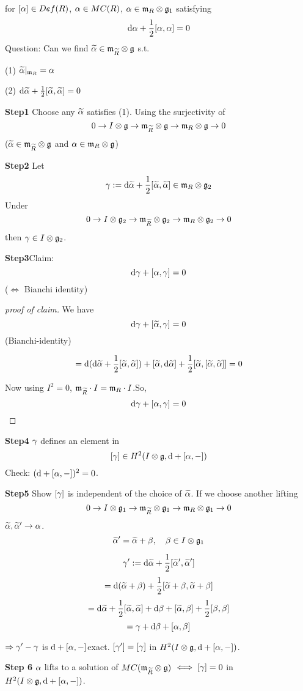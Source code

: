 for $[\alpha]\in Def(R)$, $\alpha\in MC(R)$,
$\alpha\in\mathfrak{m}_R\otimes\mathfrak{g}_1$ satisfying
$$\mathrm{d} \alpha+\frac{1}{2}[\alpha,\alpha]=0$$
Question: Can we find $\widetilde{\alpha}\in\mathfrak{m}_{\widetilde{R}}\otimes\mathfrak{g}$ s.t.

(1) $\widetilde{\alpha}|_{\mathfrak{m}_R}=\alpha$

(2) $\mathrm{d}\widetilde{\alpha}+\frac{1}{2}[\widetilde{\alpha},\widetilde{\alpha}]=0$

\textbf{Step1} Choose any $\widetilde{\alpha}$ satisfies (1).
Using the surjectivity of 
$$0\to I\otimes\mathfrak{g}\to\mathfrak{m}_{\widetilde{R}}\otimes\mathfrak{g}\to\mathfrak{m}_R\otimes\mathfrak{g}\to 0$$
($\widetilde{\alpha}\in \mathfrak{m}_{\widetilde{R}}\otimes\mathfrak{g}$ and $\alpha\in \mathfrak{m}_R\otimes\mathfrak{g}$)

\textbf{Step2} Let
$$\gamma:=\mathrm{d}\widetilde{\alpha}+\frac{1}{2}[\widetilde{\alpha},\widetilde{\alpha}]\in\mathfrak{m}_R\otimes\mathfrak{g}_2$$
Under 
$$0\to I\otimes\mathfrak{g}_2\to\mathfrak{m}_{\widetilde{R}}\otimes\mathfrak{g}_2\to\mathfrak{m}_R\otimes\mathfrak{g}_2\to 0$$
then $\gamma\in I\otimes\mathfrak{g}_2$.

\textbf{Step3}Claim: 
$$\mathrm{d}\gamma+[\alpha,\gamma]=0$$
($\iff$ Bianchi identity)

\begin{proof}[proof of claim]
We have 
$$\mathrm{d}\gamma+[\widetilde{\alpha},\gamma]=0$$
(Bianchi-identity)

$$
  =\mathrm{d}(\mathrm{d}\widetilde{\alpha}+\frac{1}{2}[\widetilde{\alpha},\widetilde{\alpha}])+[\widetilde{\alpha},\mathrm{d}\widetilde{\alpha}]
   +\frac{1}{2}[\widetilde{\alpha},[\widetilde{\alpha},\widetilde{\alpha}]]
  =0
$$

Now using $I^2=0$,
$\mathfrak{m}_{\widetilde{R}}\cdot I=\mathfrak{m}_R\cdot I$.So,
$$\mathrm{d}\gamma+[\alpha,\gamma]=0$$
\end{proof}

\textbf{Step4} $\gamma$ defines an element in
$$[\gamma]\in H^2(I\otimes\mathfrak{g},\mathrm{d}+[\alpha,-])$$
Check: $(\mathrm{d}+[\alpha,-])^2=0$.

\textbf{Step5} Show $[\gamma]$ is independent of the choice of $\widetilde{\alpha}$.
If we choose another lifting 
$$
  0\to I\otimes\mathfrak{g}_1\to\mathfrak{m}_{\widetilde{R}}\otimes\mathfrak{g}_1
  \to\mathfrak{m}_R\otimes\mathfrak{g}_1\to 0
$$
$\widetilde{\alpha},\widetilde{\alpha}'\to\alpha$.
$$\widetilde{\alpha}'=\widetilde{\alpha}+\beta,\quad\beta\in I\otimes\mathfrak{g}_1$$

$$\gamma':=\mathrm{d}\widetilde{\alpha}+\frac{1}{2}[\widetilde{\alpha}',\widetilde{\alpha}']$$
$$=\mathrm{d}(\widetilde{\alpha}+\beta)+\frac{1}{2}[\widetilde{\alpha}+\beta,\widetilde{\alpha}+\beta]$$
$$=\mathrm{d}\widetilde{\alpha}+\frac{1}{2}[\widetilde{\alpha},\widetilde{\alpha}]+\mathrm{d}\beta+[\widetilde{\alpha},\beta]+\frac{1}{2}[\beta,\beta]$$
$$=\gamma+\mathrm{d}\beta+[\alpha,\beta]$$

$\Rightarrow \gamma'-\gamma$ is $\mathrm{d}+[\alpha,-]$exact. 
$[\gamma']=[\gamma]$ in $H^2(I\otimes\mathfrak{g},\mathrm{d}+[\alpha,-])$.

\textbf{Step 6} $\alpha$ lifts to a solution of $MC(\mathfrak{m}_{\widetilde{R}}\otimes\mathfrak{g})$
$\iff[\gamma]=0$ in $H^2(I\otimes\mathfrak{g},\mathrm{d}+[\alpha,-])$.

